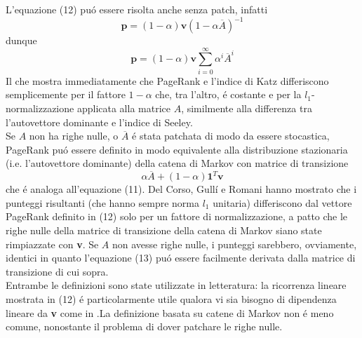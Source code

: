 L'equazione (12) puó essere risolta anche senza patch, infatti
\begin{equation}
    \textbf{p} = (1 - \alpha)\textbf{v}(1 - \alpha\overline{A})^{-1}
\end{equation}
dunque
\begin{equation*}
    \textbf{p} = (1 - \alpha)\textbf{v}\sum_{i = 0}^{\infty}{\alpha^i\overline{A}^i}
\end{equation*}
Il che mostra immediatamente che PageRank e l'indice di Katz differiscono semplicemente per il fattore $1 - \alpha$ che, tra l'altro, é costante e per la $l_1$-normalizzazione applicata alla matrice $A$, similmente alla differenza tra l'autovettore dominante e l'indice di Seeley.\\
Se $A$ non ha righe nulle, o $\overline{A}$ é stata patchata di modo da essere stocastica, PageRank puó essere definito in modo equivalente alla distribuzione stazionaria (i.e. l'autovettore dominante) della catena di Markov con matrice di transizione
\begin{equation*}
    \alpha\overline{A} + (1 - \alpha)\textbf{1}^T\textbf{v}
\end{equation*}
che é analoga all'equazione (11). Del Corso, Gullí e Romani %
hanno mostrato che i punteggi risultanti (che hanno sempre norma $l_1$ unitaria) differiscono dal vettore PageRank definito in (12) solo per un fattore di normalizzazione, a patto che le righe nulle della matrice di transizione della catena di Markov siano state rimpiazzate con \textbf{v}. Se $A$ non avesse righe nulle, i punteggi sarebbero, ovviamente, identici in quanto l'equazione (13) puó essere facilmente derivata dalla matrice di transizione di cui sopra.\\
Entrambe le definizioni sono state utilizzate in letteratura: la ricorrenza lineare mostrata in (12) é particolarmente utile qualora vi sia bisogno di dipendenza lineare da \textbf{v} come in %
.La definizione basata su catene di Markov non é meno comune, nonostante il problema di dover patchare le righe nulle.
